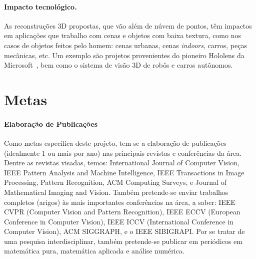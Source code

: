 \documentclass[a4paper,titlepage]{article}
\begin{document}
\paragraph{Impacto tecnológico.} 
As reconstruções 3D propostas, que vão além de núvem de pontos, têm impactos em
aplicações que trabalho com cenas e objetos com baixa textura, como nos casos de
objetos feitos pelo homem: cenas urbanas, cenas \emph{indoors}, carros, peças
mecânicas, etc. Um exemplo são projetos provenientes do pioneiro Hololens da
Microsoft~\cite{nurutdinova2015towards}, bem como o sistema de visão 3D de robôs 
e carros autônomos.


\section{Metas}
\paragraph{Elaboração de Publicações}
Como metas específica deste projeto, tem-se a elaboração de
publicações (idealmente 1 ou mais por ano) nas principais revistas e conferências da área. Dentre as
revistas visadas, temos: International
Journal of Computer Vision, IEEE Pattern Analysis and Machine Intelligence, IEEE
Transactions in Image Processing, Pattern Recognition, ACM Computing Surveys, e
Journal of Mathematical Imaging and Vision. Também pretende-se enviar trabalhos
completos (arigos) às mais importantes conferências na área, a saber: IEEE CVPR
(Computer Vision and Pattern Recognition), IEEE ECCV (European Conference in
Computer Vision), IEEE ICCV (International Conference in Computer Vision),  ACM
SIGGRAPH, e o IEEE SIBIGRAPI. Por se tratar de uma pesquisa interdisciplinar,
também pretende-se publicar em periódicos em matemática pura, matemática aplicada
e análise numérica.
\end{document}

